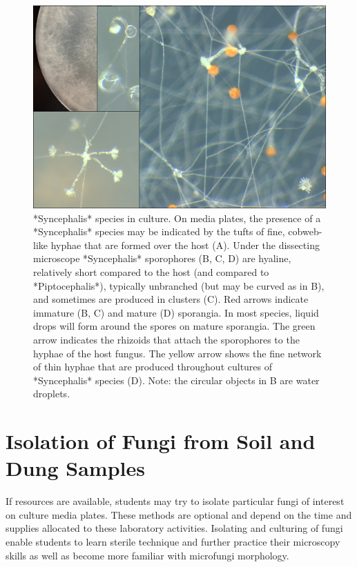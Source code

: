 \documentclass[]{book}
\begin{document}
\begin{figure}

{\centering \includegraphics[width=6.83in]{img/Fig6_Ch2} 

}

\caption{*Syncephalis* species in culture.  On media plates, the presence of a *Syncephalis* species may be indicated by the tufts of fine, cobweb-like hyphae that are formed over the host (A).  Under the dissecting microscope *Syncephalis* sporophores (B, C, D) are hyaline, relatively short compared to the host (and compared to *Piptocephalis*), typically unbranched (but may be curved as in B), and sometimes are produced in clusters (C).  Red arrows indicate immature (B, C) and mature (D) sporangia.  In most species, liquid drops will form around the spores on mature sporangia.  The green arrow indicates the rhizoids that attach the sporophores to the hyphae of the host fungus.  The yellow arrow shows the fine network of thin hyphae that are produced throughout cultures of *Syncephalis* species (D).  Note: the circular objects in B are water droplets.}\label{fig:ch2fig6}
\end{figure}

\section{Isolation of Fungi from Soil and Dung
Samples}\label{isolation-of-fungi-from-soil-and-dung-samples}

If resources are available, students may try to isolate particular fungi
of interest on culture media plates. These methods are optional and
depend on the time and supplies allocated to these laboratory
activities. Isolating and culturing of fungi enable students to learn
sterile technique and further practice their microscopy skills as well
as become more familiar with microfungi morphology.
\end{document}
